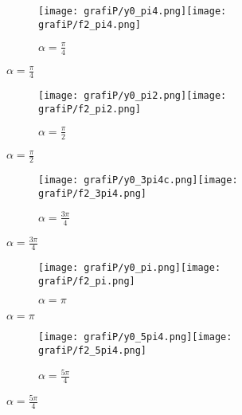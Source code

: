 \documentclass[12pt, a4paper]{article}
\begin{document}
\begin{figure}[h]
\hspace{-10pt}
  \begin{subfigure}[b]{0.5\textwidth}
    \centering
    \texttt{[image: grafiP/y0\_pi4.png]}\texttt{[image: grafiP/f2\_pi4.png]}
    \caption{$\alpha = \frac{\pi}{4}$}
    \label{graf}
  \end{subfigure}
\end{figure}
\begin{figure}[h]
\vspace{-50pt}
  \begin{subfigure}[b]{0.5\textwidth}
    \centering
    \texttt{[image: grafiP/y0\_pi2.png]}\texttt{[image: grafiP/f2\_pi2.png]}
    \caption{$\alpha = \frac{\pi}{2}$}
    \label{graf}
  \end{subfigure}
\end{figure}
\begin{figure}[h]
\vspace{-50pt}
  \begin{subfigure}[b]{0.5\textwidth}
    \centering
    \texttt{[image: grafiP/y0\_3pi4c.png]}\texttt{[image: grafiP/f2\_3pi4.png]}
    \caption{$\alpha = \frac{3\pi}{4}$}
    \label{graf}
  \end{subfigure}
\end{figure}
\begin{figure}[h]
\vspace{-50pt}
  \begin{subfigure}[b]{0.5\textwidth}
    \centering
    \texttt{[image: grafiP/y0\_pi.png]}\texttt{[image: grafiP/f2\_pi.png]}
    \caption{$\alpha = \pi$}
    \label{graf}
  \end{subfigure}
\end{figure}
\begin{figure}[h]
\vspace{-50pt}
  \begin{subfigure}[b]{0.5\textwidth}
    \centering
    \texttt{[image: grafiP/y0\_5pi4.png]}\texttt{[image: grafiP/f2\_5pi4.png]}
    \caption{$\alpha = \frac{5\pi}{4}$}
    \label{graf}
  \end{subfigure}
\end{figure}
\end{document}

